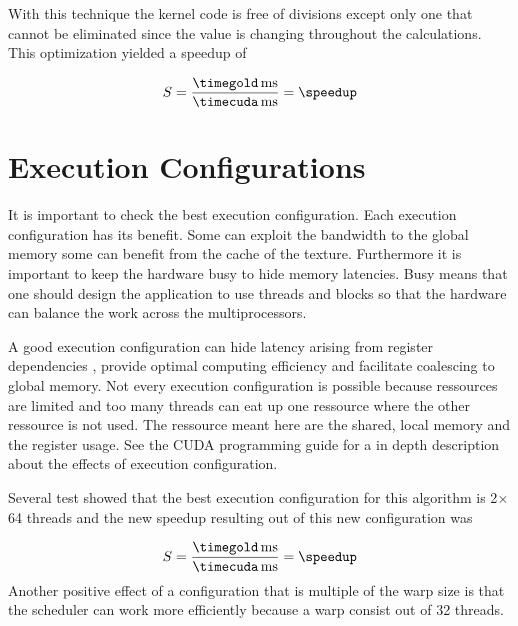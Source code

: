 With this technique the kernel code is free of divisions except only one that
cannot be eliminated since the value is changing throughout the calculations.
This optimization yielded a speedup of

\fpDiv{\speedup}{\timegold}{\timecuda}
\begin{equation*}\label{eq:speedup3}
	S = \frac{\unit[\timegold]{ms}}{\unit[\timecuda]{ms}} = \speedup
\end{equation*}


\section{Execution Configurations} %
\label{sec:run_configurations}
It is important to check the best execution configuration. Each execution
configuration has its benefit. Some can exploit the bandwidth to the global
memory some can benefit from the cache of the texture. Furthermore it is
important to keep the hardware busy to hide memory latencies. Busy means that
one should design the application to use threads and blocks so that the
hardware can balance the work across the multiprocessors.

A good execution configuration can hide latency arising from register
dependencies , provide optimal computing efficiency and facilitate coalescing to
global memory. Not every execution configuration is possible because ressources
are limited and too many threads can eat up one ressource where the other ressource
is not used. The ressource meant here are the shared, local memory and the register
usage. See the \gls{CUDA} programming guide \citep{citeulike:3325943} for a in 
depth description about the effects of execution configuration.

Several test showed that the best execution configuration for this algorithm is
2$\times$64 threads and the new speedup  resulting out of this new configuration
was

\fpDiv{\speedup}{\timegold}{\timecuda}
\begin{equation*}\label{eq:speedup4}
	S = \frac{\unit[\timegold]{ms}}{\unit[\timecuda]{ms}} = \speedup
\end{equation*}
 Another positive effect of a configuration that is multiple of the warp size is
that the scheduler can work more efficiently because a warp consist out of 32 
threads. 

